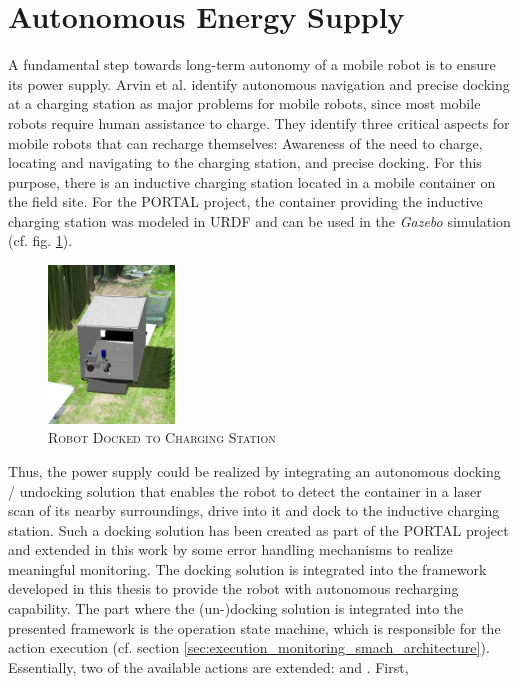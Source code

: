 \documentclass[english, master, utf8]{base/thesis_KBS}
\newcommand{\code}{\collectverb{\codebox}}
\begin{document}
\vfill
\pagebreak

\section{Autonomous Energy Supply}
\label{sec:docking_solution}

A fundamental step towards long-term autonomy of a mobile robot is to ensure its power supply. Arvin et al. \cite{Arvin:2009} identify autonomous navigation and precise docking at
a charging station as major problems for mobile robots, since most mobile robots require human assistance to charge. They identify three critical aspects for mobile robots that can
recharge themselves: Awareness of the need to charge, locating and navigating to the charging station, and precise docking. For this purpose, there is an inductive charging station
located in a mobile container on the field site. For the PORTAL project, the container providing the inductive charging station was modeled in URDF and can be used in the \textit{Gazebo} simulation (cf.
fig. \ref{fig:container_model}).
\begin{figure}[H]
    \centering
    \includegraphics[width=0.3\textwidth]{pics/docked.png}
    \caption{\textsc{Robot Docked to Charging Station}}
    \label{fig:container_model}
\end{figure}
Thus, the power supply could be realized by integrating an autonomous docking / undocking solution that enables the robot to detect the container in a laser scan of its nearby
surroundings, drive into it and dock to the inductive charging station. Such a docking solution has been created as part of the PORTAL project and extended in this work by some
error handling mechanisms to realize meaningful monitoring. The docking solution is integrated into the framework developed in this thesis to provide the robot with autonomous
recharging capability. The part where the (un-)docking solution is integrated into the presented framework is
the operation state machine, which is responsible for the action execution (cf. section \ref{sec:execution_monitoring_smach_architecture}). Essentially, two of the available actions are extended: \code{return_to_base} and \code{charge}. First,
\end{document}
